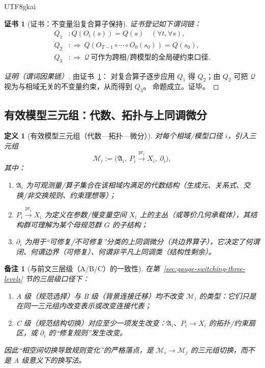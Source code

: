 \documentclass[12pt]{article}
\newtheorem{definition}{定义}[section]
\newtheorem{remark}{备注}[section]
\newtheorem{Certificate}{证书}[section]
\newcommand{\Bundle}{\ensuremath{P}}
\newcommand{\pr}{\operatorname{pr}}
\newcommand{\Group}{\ensuremath{G}}
\begin{document}
\begin{CJK*}{UTF8}{gkai}
\begin{Certificate}[证书：不变量沿复合算子保持]
\label{cert:conserved-bedrock-provides-global-constraints}
证书登记如下谓词链：
\[
\begin{aligned}
  Q_1 &: Q(O_t(s))=Q(s)\quad(\forall t,\forall s),\\
  Q_2 &: \Rightarrow\ Q(O_{T-1}\circ\cdots\circ O_0(s_0))=Q(s_0),\\
  Q_3 &: \Rightarrow\ \mathcal{Q}\ \text{可作为跨相/跨模型的全局硬约束口径}.
\end{aligned}
\]
\end{Certificate}

\begin{proof}[证明（谓词因果链）]
由证书~\ref{cert:conserved-bedrock-provides-global-constraints}：
对复合算子逐步应用 $Q_1$ 得 $Q_2$；由 $Q_2$ 可把 $\mathcal{Q}$ 视为与相域无关的不变量约束，从而得到 $Q_3$。
命题成立。证毕。
\end{proof}

\subsection{有效模型三元组：代数、拓扑与上同调微分}
\label{sec:effective-model-triple}

\begin{definition}[有效模型三元组（代数—拓扑—微分）]
对每个相域/模型口径 $i$，引入三元组
\[
  \mathcal{M}_i := \bigl(\mathfrak{A}_i,\ \Bundle_i\xrightarrow{\pr_i} X_i,\ \partial_i\bigr),
\]
其中：
\begin{enumerate}
  \item $\mathfrak{A}_i$ 为可观测量/算子集合在该相域内满足的代数结构（生成元、关系式、交换/非交换规则、约束理想等）；
  \item $\Bundle_i\xrightarrow{\pr_i} X_i$ 为定义在参数/慢变量空间 $X_i$ 上的主丛（或等价几何承载体），其结构群可理解为某个母规范群 $\Group$ 的子结构；
  \item $\partial_i$ 为用于“可修复/不可修复”分类的上同调微分（共边界算子），它决定了何谓闭、何谓边界（可修复）、何谓非平凡上同调类（结构性剩余）。
\end{enumerate}
\end{definition}

\begin{remark}[与前文三层级（A/B/C）的一致性]
在第~\ref{sec:gauge-switching-three-levels} 节的三层级口径下：
\begin{enumerate}
  \item A 级（规范选择）与 B 级（背景连接迁移）均不改变 $\mathcal{M}_i$ 的类型：它们只是在同一三元组内改变表示或改变连接代表；
  \item C 级（规范结构切换）对应至少一项发生改变：$\mathfrak{A}_i$、$\Bundle_i\to X_i$ 的拓扑/约束扇区，或 $\partial_i$ 的“修复规则”发生改变。
\end{enumerate}
因此“相空间切换导致规则变化”的严格落点，是 $\mathcal{M}_i\to\mathcal{M}_j$ 的三元组切换，而不是 A 级意义下的换写法。
\end{remark}


\end{CJK*}
\end{document}
